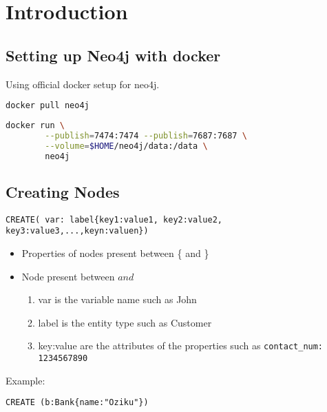\documentclass[../main.tex]{subfiles}
\begin{document}
% 
% 
% 

\chapter{Introduction}
\section{Setting up Neo4j with docker}
Using official docker setup \href{https://hub.docker.com/_/neo4j}{\color{blue}{link}} for neo4j.
\begin{lstlisting}[language=bash, caption={get neo4j image}]
docker pull neo4j
\end{lstlisting}
\begin{lstlisting}[language=bash, caption={Starting neo4j container}]
docker run \
		--publish=7474:7474 --publish=7687:7687 \
		--volume=$HOME/neo4j/data:/data \
		neo4j
\end{lstlisting}

\section{Creating Nodes}
\begin{lstlisting}[language=cypher, caption={Create Node}]
CREATE( var: label{key1:value1, key2:value2, key3:value3,...,keyn:valuen})
\end{lstlisting}
\begin{itemize}
	\item{Properties of nodes present between \{ and \}}
	\item{ 
			Node present between \( and \)
			\begin{enumerate}
				\item{var is the variable name such as John}
				\item{label is the entity type such as Customer}
				\item{key:value are the attributes of the properties such as  \lstinline{contact_num: 1234567890}}
			\end{enumerate}
		}
\end{itemize}
Example: 
\begin{lstlisting}[language=cypher, caption={Create Node Example}]
CREATE (b:Bank{name:"Oziku"})
\end{lstlisting}
\end{document}
